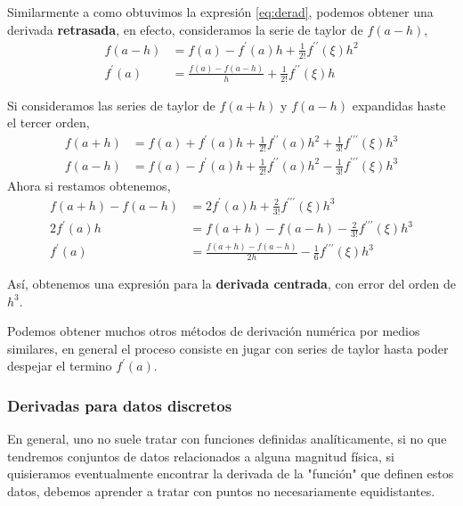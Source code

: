 Similarmente a como obtuvimos la expresión \eqref{eq:derad}, podemos obtener una derivada \textbf{retrasada}, en efecto, consideramos la serie de taylor de $f(a-h)$,
\begin{align}
  f(a - h) &= f(a) - f^{\prime}(a)h + \frac{1}{2!}f^{\prime \prime}(\xi)h^{2} \\
  f^{\prime}(a) &= \frac{f(a) - f(a-h)}{h} + \frac{1}{2!}f^{\prime \prime}(\xi)h \label{eq:deriret}
\end{align}

Si consideramos las series de taylor de $f(a+h)$ y $f(a-h)$ expandidas haste el tercer orden,
\begin{align}
  f(a+h) &= f(a) + f^{\prime}(a)h + \frac{1}{2!}f^{\prime \prime}(a)h^{2} + \frac{1}{3!}f^{\prime \prime \prime}(\xi)h^{3} \\
  f(a-h) &= f(a) - f^{\prime}(a)h + \frac{1}{2!}f^{\prime \prime}(a)h^{2} - \frac{1}{3!}f^{\prime \prime \prime}(\xi)h^{3}
\end{align}
Ahora si restamos obtenemos,
\begin{align}
  f(a+h) - f(a-h) &= 2f^{\prime}(a)h + \frac{2}{3!}f^{\prime \prime \prime}(\xi)h^{3} \\
  2f^{\prime}(a)h &= f(a+h) - f(a-h) - \frac{2}{3!}f^{\prime \prime \prime}(\xi)h^{3} \\
  f^{\prime}(a) &= \frac{f(a+h) - f(a-h)}{2h} - \frac{1}{6}f^{\prime \prime \prime}(\xi)h^{3} \label{eq:dercen}
\end{align}

Así, obtenemos una expresión para la \textbf{derivada centrada}, con error del orden de $h^{3}$.

Podemos obtener muchos otros métodos de derivación numérica por medios similares, en general el proceso consiste en jugar con series de taylor hasta poder despejar el termino $f^{\prime}(a)$. 

\subsubsection{Derivadas para datos discretos}

En general, uno no suele tratar con funciones definidas analíticamente, si no que tendremos conjuntos de datos relacionados a alguna magnitud física, si quisieramos eventualmente encontrar la derivada de la "función" que definen estos datos, debemos aprender a tratar con puntos no necesariamente equidistantes.

